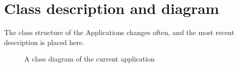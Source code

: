 \section{Class description and diagram}

The class structure of the Applications changes often, and the most recent description is placed here. 
\begin{figure}[p]
\label{fig:ClassDiagram}
\caption{A class diagram of the current application}
\setlength\fboxsep{0pt}
\setlength\fboxrule{1pt}
\end{figure}



 





